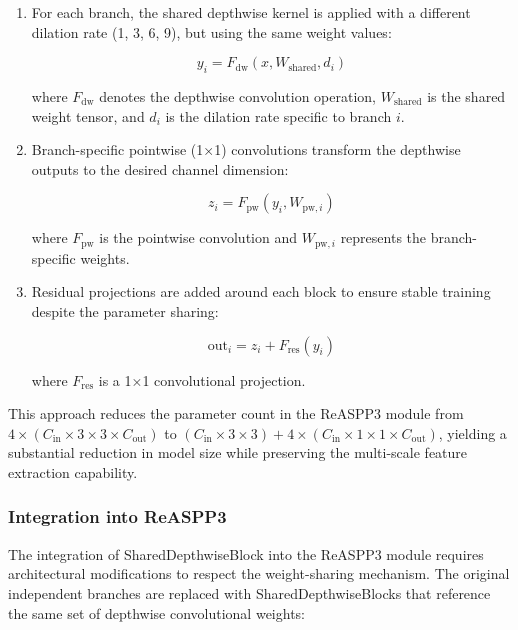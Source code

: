 \documentclass[12pt,a4paper]{article}
\begin{document}
\begin{enumerate}
\begin{enumerate}
\item For each branch, the shared depthwise kernel is applied with a different dilation rate (1, 3, 6, 9), but using the same weight values:
   
   \begin{equation}
   y_{i} = F_{\textrm{dw}}(x, W_{\textrm{shared}}, d_i)
   \end{equation}
   
   where $F_{\textrm{dw}}$ denotes the depthwise convolution operation, $W_{\textrm{shared}}$ is the shared weight tensor, and $d_i$ is the dilation rate specific to branch $i$.

\item Branch-specific pointwise (1×1) convolutions transform the depthwise outputs to the desired channel dimension:
   
   \begin{equation}
   z_{i} = F_{\textrm{pw}}(y_{i}, W_{\textrm{pw},i})
   \end{equation}
   
   where $F_{\textrm{pw}}$ is the pointwise convolution and $W_{\textrm{pw},i}$ represents the branch-specific weights.

\item Residual projections are added around each block to ensure stable training despite the parameter sharing:
   
   \begin{equation}
   \textrm{out}_{i} = z_{i} + F_{\textrm{res}}(y_{i})
   \end{equation}
   
   where $F_{\textrm{res}}$ is a 1×1 convolutional projection.
\end{enumerate}

This approach reduces the parameter count in the ReASPP3 module from $4 \times (C_{\textrm{in}} \times 3 \times 3 \times C_{\textrm{out}})$ to $(C_{\textrm{in}} \times 3 \times 3) + 4 \times (C_{\textrm{in}} \times 1 \times 1 \times C_{\textrm{out}})$, yielding a substantial reduction in model size while preserving the multi-scale feature extraction capability.

\subsubsection{Integration into ReASPP3}

The integration of SharedDepthwiseBlock into the ReASPP3 module requires architectural modifications to respect the weight-sharing mechanism. The original independent branches are replaced with SharedDepthwiseBlocks that reference the same set of depthwise convolutional weights:


\end{enumerate}
\end{document}
